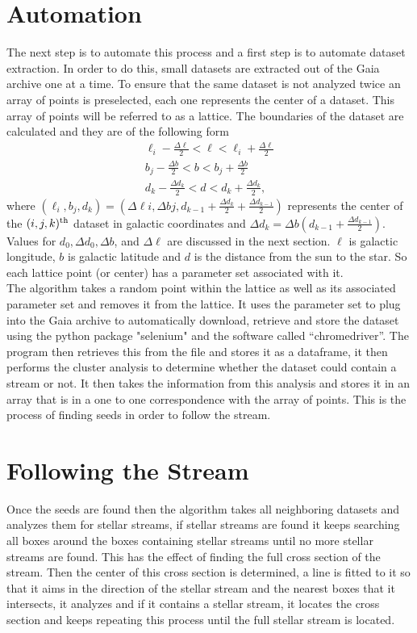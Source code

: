 \documentclass[notitlepage,nofootinbib,preprintnumbers,aps,prd]{revtex4-1}
\begin{document}
\section*{Automation }
\indent The next step is to automate this process and a first step is to automate dataset extraction. In order to do this, small datasets are extracted out of the Gaia archive one at a time. To ensure that the same dataset is not analyzed twice an array of points is preselected, each one represents the center of a dataset. This array of points will be referred to as a lattice. The boundaries of the dataset are calculated and they are of the following form
\begin{align*}
	\ell_i - \frac{\Delta \ell}{2} < \ell < \ell_i + \frac{\Delta \ell}{2}\\
	b_j - \frac{\Delta b}{2} < b < b_j + \frac{\Delta b}{2}\\ 
	d_k - \frac{\Delta d_k}{2} < d < d_k + \frac{\Delta d_k}{2},
\end{align*}
where $(\ell_i,b_j,d_k)=(\Delta \ell i, \Delta b j, d_{k-1} + \frac{\Delta d_k}{2} + \frac{\Delta d_{k-1}}{2}) $ represents the center of the $(i,j,k)^{\rm{th}}$ dataset in galactic coordinates and $\Delta d_k = \Delta b (d_{k-1} + \frac{\Delta d_{k-1}}{2})$. Values for $d_0, \Delta d_0, \Delta b$, and $\Delta \ell$ are discussed in the next section. $\ell$ is galactic longitude, $b$ is galactic latitude and $d$ is the distance from the sun to the star. So each lattice point (or center) has a parameter set associated with it.\\
	

\indent The algorithm takes a random point within the lattice as well as its associated parameter set and removes it from the lattice. It uses the parameter set to plug into the Gaia archive to automatically download, retrieve and store the dataset using the python package "selenium" and the software called “chromedriver”. The program then retrieves this from the file and stores it as a dataframe, it then performs the cluster analysis to determine whether the dataset could contain a stream or not. It then takes the information from this analysis and stores it in an array that is in a one to one correspondence with the array of points. This is the process of finding seeds in order to follow the stream. \\

\section*{Following the Stream} 
\indent Once the seeds are found then the algorithm takes all neighboring datasets and analyzes them for stellar streams, if stellar streams are found it keeps searching all boxes around the boxes containing stellar streams until no more stellar streams are found. This has the effect of finding the full cross section of the stream. Then the center of this cross section is determined, a line is fitted to it so that it aims in the direction of the stellar stream and the nearest boxes that it intersects, it analyzes and if it contains a stellar stream, it locates the cross section and keeps repeating this process until the full stellar stream is located.\\
\end{document}
